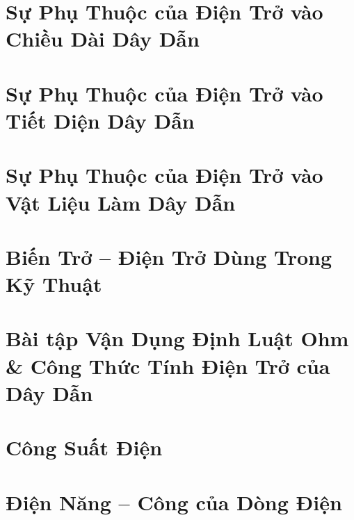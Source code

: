 \documentclass{article}
\begin{document}

\section{Sự Phụ Thuộc của Điện Trở vào Chiều Dài Dây Dẫn}


\section{Sự Phụ Thuộc của Điện Trở vào Tiết Diện Dây Dẫn}


\section{Sự Phụ Thuộc của Điện Trở vào Vật Liệu Làm Dây Dẫn}


\section{Biến Trở -- Điện Trở Dùng Trong Kỹ Thuật}


\section{Bài tập Vận Dụng Định Luật Ohm \& Công Thức Tính Điện Trở của Dây Dẫn}


\section{Công Suất Điện}


\section{Điện Năng -- Công của Dòng Điện}
\end{document}
